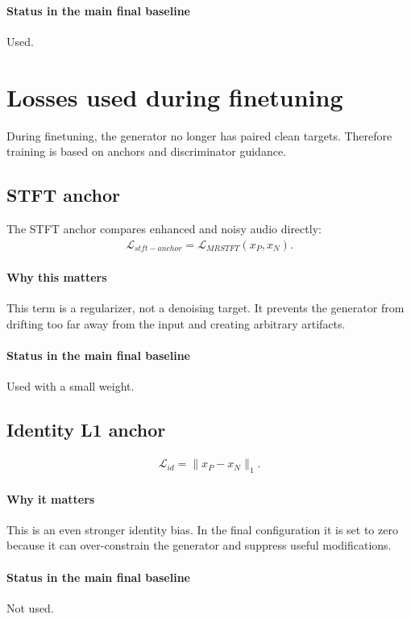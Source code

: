\documentclass[11pt]{article}
\begin{document}
\paragraph{Status in the main final baseline}
Used.

\section{Losses used during finetuning}
During finetuning, the generator no longer has paired clean targets. Therefore training is based on anchors and discriminator guidance.

\subsection{STFT anchor}
The STFT anchor compares enhanced and noisy audio directly:
\begin{align}
    \mathcal{L}_{stft-anchor} = \mathcal{L}_{MRSTFT}(x_P, x_N).
\end{align}

\paragraph{Why this matters}
This term is a regularizer, not a denoising target. It prevents the generator from drifting too far away from the input and creating arbitrary artifacts.

\paragraph{Status in the main final baseline}
Used with a small weight.

\subsection{Identity L1 anchor}
\begin{align}
    \mathcal{L}_{id} = \|x_P - x_N\|_1.
\end{align}

\paragraph{Why it matters}
This is an even stronger identity bias. In the final configuration it is set to zero because it can over-constrain the generator and suppress useful modifications.

\paragraph{Status in the main final baseline}
Not used.
\end{document}
